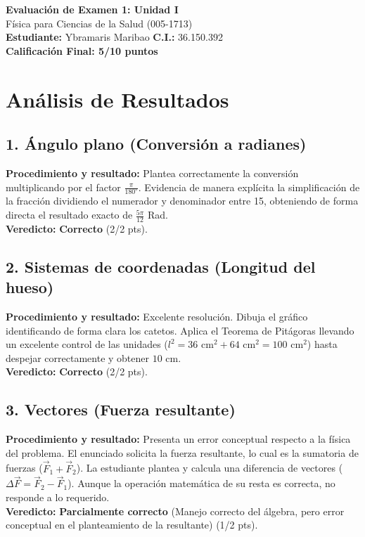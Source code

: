 \documentclass[12pt]{article}
\begin{document}
\begin{center}
    \Large \textbf{Evaluación de Examen 1: Unidad I} \\
    \large Física para Ciencias de la Salud (005-1713) \\
    \vspace{0.5cm}
    \textbf{Estudiante:} Ybramaris Maribao \quad \textbf{C.I.:} 36.150.392
    \vspace{0.3cm} \\
    \large \textbf{Calificación Final: 5/10 puntos}
\end{center}

\vspace{0.5cm}

\section*{Análisis de Resultados}

\subsection*{1. Ángulo plano (Conversión a radianes)}
\textbf{Procedimiento y resultado:} Plantea correctamente la conversión multiplicando por el factor $\frac{\pi}{180^\circ}$. Evidencia de manera explícita la simplificación de la fracción dividiendo el numerador y denominador entre 15, obteniendo de forma directa el resultado exacto de $\frac{5\pi}{12}$ Rad. \\
\textbf{Veredicto:} \textbf{Correcto} (2/2 pts).

\subsection*{2. Sistemas de coordenadas (Longitud del hueso)}
\textbf{Procedimiento y resultado:} Excelente resolución. Dibuja el gráfico identificando de forma clara los catetos. Aplica el Teorema de Pitágoras llevando un excelente control de las unidades ($l^2 = 36\text{ cm}^2 + 64\text{ cm}^2 = 100\text{ cm}^2$) hasta despejar correctamente y obtener $10$ cm. \\
\textbf{Veredicto:} \textbf{Correcto} (2/2 pts).

\subsection*{3. Vectores (Fuerza resultante)}
\textbf{Procedimiento y resultado:} Presenta un error conceptual respecto a la física del problema. El enunciado solicita la fuerza resultante, lo cual es la sumatoria de fuerzas ($\vec{F}_1 + \vec{F}_2$). La estudiante plantea y calcula una diferencia de vectores ($\Delta\vec{F} = \vec{F}_2 - \vec{F}_1$). Aunque la operación matemática de su resta es correcta, no responde a lo requerido. \\
\textbf{Veredicto:} \textbf{Parcialmente correcto} (Manejo correcto del álgebra, pero error conceptual en el planteamiento de la resultante) (1/2 pts).
\end{document}
